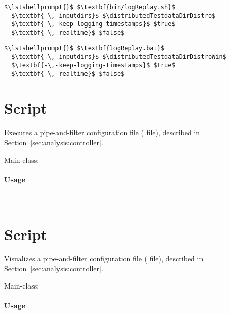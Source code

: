 
\setTextListing
\begin{lstlisting}[caption=Execution under UNIX-like systems]
$\lstshellprompt{}$ $\textbf{bin/logReplay.sh}$
  $\textbf{-\,-inputdirs}$ $\distributedTestdataDirDistro$ 
  $\textbf{-\,-keep-logging-timestamps}$ $true$ 
  $\textbf{-\,-realtime}$ $false$
\end{lstlisting}
\begin{lstlisting}[caption=Execution under Windows]
$\lstshellprompt{}$ $\textbf{logReplay.bat}$
  $\textbf{-\,-inputdirs}$ $\distributedTestdataDirDistroWin$ 
  $\textbf{-\,-keep-logging-timestamps}$ $true$ 
  $\textbf{-\,-realtime}$ $false$
\end{lstlisting}


\section{Script }\label{appendix:wrapperScripts:kaxRun}

Executes a \KiekerAnalysisPart{} pipe-and-filter configuration file ( file), %
described in Section~\ref{sec:analysis:controller}. %

\noindent Main-class: {\small {}}

\paragraph*{Usage}\

\setTextListing


\section{Script }\label{appendix:wrapperScripts:kaxViz}

Visualizes a \KiekerAnalysisPart{} pipe-and-filter configuration file ( file), %
described in Section~\ref{sec:analysis:controller}. %

\noindent Main-class: {\small {}}

\paragraph*{Usage}\

\setTextListing



